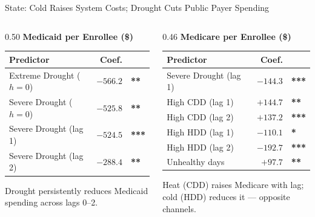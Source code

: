 \documentclass[aspectratio=169,11pt]{beamer}
\newcommand{\emphcolor}[1]{{\color{WarmOrange}\textbf{#1}}}
\newcommand{\tealtext}[1]{{\color{Teal}#1}}
\newcommand{\graytext}[1]{{\color{WarmGray}#1}}
\begin{document}
\begin{frame}{State: Cold Raises System Costs; Drought Cuts Public Payer Spending}
\begin{columns}[T]
\begin{column}{0.50\textwidth}
      \tealtext{\textbf{Medicaid per Enrollee (\$)}}\\[0.25em]
      \begin{tabular}{lrl}
        \toprule
        Predictor & Coef. & \\
        \midrule
        Extreme Drought ($h{=}0$) & $-566.2$ & \emphcolor{**}  \\
        Severe Drought ($h{=}0$)  & $-525.8$ & \emphcolor{**}  \\
        Severe Drought (lag 1)    & $-524.5$ & \emphcolor{***} \\
        Severe Drought (lag 2)    & $-288.4$ & \emphcolor{**}  \\
        \bottomrule
      \end{tabular}
      \vspace{0.2em}
      \graytext{\scriptsize Drought persistently reduces Medicaid\\spending across lags 0--2.}
    \end{column}
    \begin{column}{0.46\textwidth}
      \tealtext{\textbf{Medicare per Enrollee (\$)}}\\[0.25em]
      \begin{tabular}{lrl}
        \toprule
        Predictor & Coef. & \\
        \midrule
        Severe Drought (lag 1)   & $-144.3$ & \emphcolor{***} \\
        High CDD (lag 1)         & $+144.7$ & \emphcolor{**}  \\
        High CDD (lag 2)         & $+137.2$ & \emphcolor{***} \\
        High HDD (lag 1)         & $-110.1$ & \emphcolor{*}   \\
        High HDD (lag 2)         & $-192.7$ & \emphcolor{***} \\
        Unhealthy days & $+97.7$  & \emphcolor{**}  \\
        \bottomrule
      \end{tabular}
      \vspace{0.2em}
      \graytext{\scriptsize Heat (CDD) raises Medicare with lag;\\cold (HDD) reduces it — opposite channels.}
    \end{column}
  \end{columns}
\end{frame}
\end{document}
